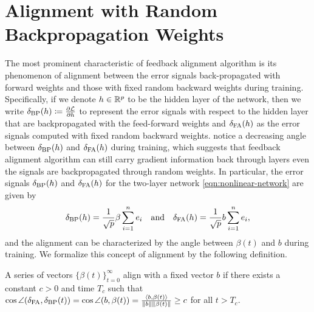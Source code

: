 
\section{Alignment with Random Backpropagation Weights}\label{sec:alignment}

The most prominent characteristic of feedback alignment algorithm is its phenomenon of alignment between the error signals back-propagated with forward weights and those with fixed random backward weights during training. Specifically, if we denote $h\in \mathbb{R}^p$ to be the hidden layer of the network, then we write $\delta_\mathrm{BP}(h) \coloneqq \frac{\partial \mathcal{L}}{\partial h}$ to represent the error signals with respect to the hidden layer that are backpropagated with the feed-forward weights and $\delta_\mathrm{FA}(h)$ as the error signals computed with fixed random backward weights.
\citet{lillicrap2016random} notice a decreasing angle between $\delta_\mathrm{BP}(h)$ and $\delta_\mathrm{FA}(h)$ during training, which suggests that feedback alignment algorithm can still carry gradient information back through layers even the signals are backpropagated through random weights.
In particular, the error signals $\delta_\mathrm{BP}(h)$ and $\delta_\mathrm{FA}(h)$ for the two-layer network \eqref{eqn:nonlinear-network} are given by
\begin{equation}
    \delta_\mathrm{BP}(h) = \frac{1}{\sqrt{p}}\beta\sum_{i=1}^ne_i \quad\text{and}\quad \delta_\mathrm{FA}(h) = \frac{1}{\sqrt{p}}b\sum_{i=1}^ne_i,
\end{equation}
and the alignment can be characterized by the angle between $\beta(t)$ and $b$ during training. We formalize this concept of alignment by the following definition.
\begin{definition}\label{def:alignment}
    A series of vectors $\{\beta(t)\}_{t=0}^\infty$ align with a fixed vector $b$ if there exists a constant $c>0$ and time $T_c$ such that  $\cos\angle(\delta_\mathrm{FA}, \delta_\mathrm{BP}(t)) = \cos\angle(b, \beta(t)) = \frac{\langle b, \beta(t)\rangle}{\|b\|\|\beta(t)\|} \geq c$ for all $t > T_c$.
\end{definition}

